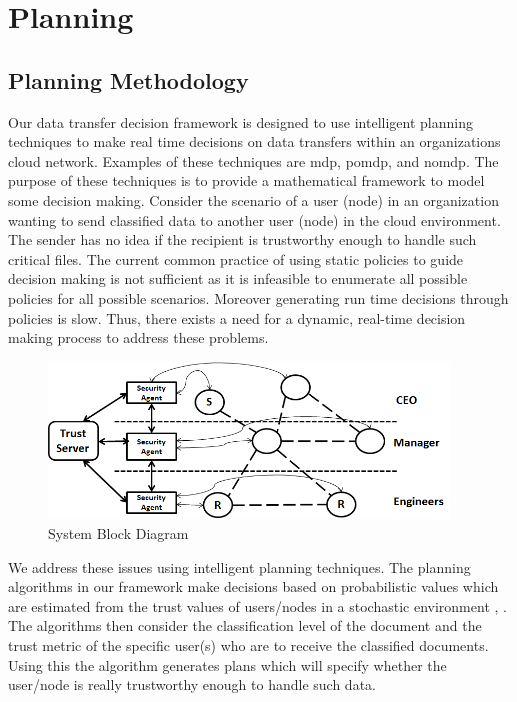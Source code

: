 \section{Planning}
\subsection{Planning Methodology}
Our data transfer decision framework is designed to use intelligent planning
techniques to make real time decisions on data transfers within an organizations cloud
network. Examples of these techniques are \gls{mdp}, \gls{pomdp}, and \gls{nomdp}.
The purpose of these techniques is to provide a mathematical framework
to model some decision making. Consider the scenario of a user (node) in an
organization wanting to send classified data to another user (node) in the cloud
environment. The sender has no idea if the recipient is trustworthy enough to
handle such critical files. The current common practice of using static policies to
guide decision making is not sufficient as it is infeasible to enumerate all
possible policies for all possible scenarios. Moreover generating run time
decisions through policies is slow. Thus, there exists a need for a dynamic,
real-time decision making process to address these problems. 
\FloatBarrier
\begin{figure}[h!]
    \label{fig:SystemBlockDiagram}
    \begin{center}
        \includegraphics[width=0.95\textwidth]{Figures/Planning_Figure_1.png}
        \caption{System Block Diagram}
    \end{center}
\end{figure}
\FloatBarrier
We address these issues using intelligent planning techniques. The planning
algorithms in our framework make decisions based on probabilistic values which
are estimated from the trust values of users/nodes in a stochastic environment
\autocite{JMarecki2012}, \autocite{JWu.2011}. The algorithms then consider the classification level
of the document and the trust metric of the specific user(s) who are to receive
the classified documents. Using this the algorithm generates plans which will specify whether the
user/node is really trustworthy enough to handle such data.  

